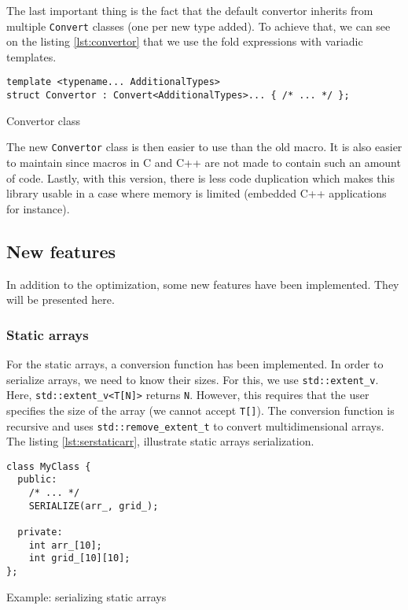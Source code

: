 The last important thing is the fact that the default convertor inherits from
multiple \texttt{Convert} classes (one per new type added). To achieve that, we
can see on the listing \ref{lst:convertor} that we use the fold expressions with
variadic templates.

\begin{listing}[ht!]
\begin{verbatim}
template <typename... AdditionalTypes>
struct Convertor : Convert<AdditionalTypes>... { /* ... */ };
\end{verbatim}
\caption{Convertor class}
\label{lst:convertor}
\end{listing}

The new \texttt{Convertor} class is then easier to use than the old macro. It
is also easier to maintain since macros in C and C++ are not made to contain
such an amount of code. Lastly, with this version, there is less code
duplication which makes this library usable in a case where memory is limited
(embedded C++ applications for instance).

\subsection{New features}

In addition to the optimization, some new features have been implemented. They
will be presented here.

\subsubsection{Static arrays}

For the static arrays, a conversion function has been implemented. In order to
serialize arrays, we need to know their sizes. For this, we use
\texttt{std::extent\_v}. Here, \texttt{std::extent\_v<T[N]>} returns \texttt{N}.
However, this requires that the user specifies the size of the array (we cannot
accept \texttt{T[]}). The conversion function is recursive and uses
\texttt{std::remove\_extent\_t} to convert multidimensional arrays. The listing
\ref{lst:serstaticarr}, illustrate static arrays serialization.

\begin{listing}[ht!]
\begin{verbatim}
class MyClass {
  public:
    /* ... */
    SERIALIZE(arr_, grid_);

  private:
    int arr_[10];
    int grid_[10][10];
};
\end{verbatim}
\caption{Example: serializing static arrays}
\label{lst:serstaticarr}
\end{listing}

